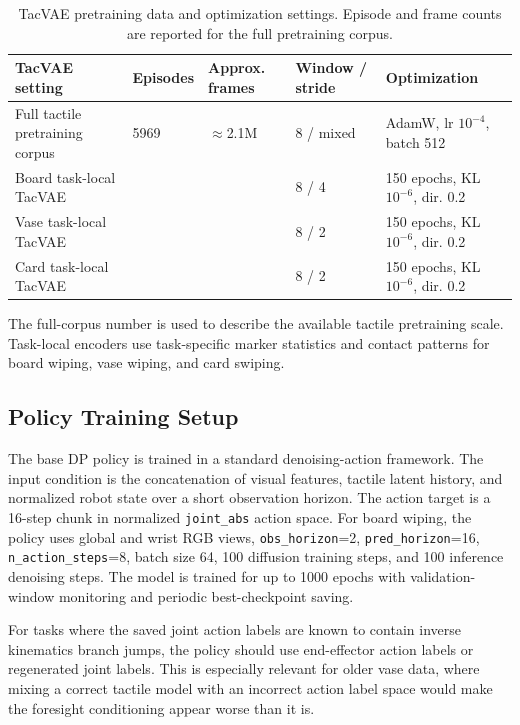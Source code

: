 \documentclass[10pt,letterpaper]{article}
\newcommand{\tabstyle}{\small\setlength{\tabcolsep}{3pt}\renewcommand{\arraystretch}{1.15}}
\begin{document}
\begin{table}[H]
\caption{TacVAE pretraining data and optimization settings. Episode and frame
counts are reported for the full pretraining corpus.}
\label{tab:tacvae_pretrain_setup}
\centering
\tabstyle
\begin{tabular}{p{}p{}p{}p{}p{}}
\toprule
TacVAE setting & Episodes & Approx. frames & Window / stride & Optimization\\
\midrule
Full tactile pretraining corpus & 5969 & $\approx$2.1M & 8 / mixed & AdamW, lr $10^{-4}$, batch 512\\
Board task-local TacVAE & & & 8 / 4 & 150 epochs, KL $10^{-6}$, dir. 0.2\\
Vase task-local TacVAE & & & 8 / 2 & 150 epochs, KL $10^{-6}$, dir. 0.2\\
Card task-local TacVAE & & & 8 / 2 & 150 epochs, KL $10^{-6}$, dir. 0.2\\
\bottomrule
\end{tabular}
\end{table}

The full-corpus number is used to describe the available tactile pretraining
scale. Task-local encoders use task-specific marker statistics and contact
patterns for board wiping, vase wiping, and card swiping.

\subsection{Policy Training Setup}

The base DP policy is trained in a standard denoising-action framework. The
input condition is the concatenation of visual features, tactile latent
history, and normalized robot state over a short observation horizon. The action
target is a 16-step chunk in normalized \texttt{joint\_abs} action space. For
board wiping, the policy uses global and wrist RGB
views, \texttt{obs\_horizon}=2, \texttt{pred\_horizon}=16,
\texttt{n\_action\_steps}=8, batch size 64, 100 diffusion training steps, and
100 inference denoising steps. The model is trained for up to 1000 epochs with
validation-window monitoring and periodic best-checkpoint saving.

For tasks where the saved joint action labels are known to contain inverse
kinematics branch jumps, the policy should use end-effector action labels or
regenerated joint labels. This is especially relevant for older vase data,
where mixing a correct tactile model with an incorrect action label space would
make the foresight conditioning appear worse than it is.
\end{document}
